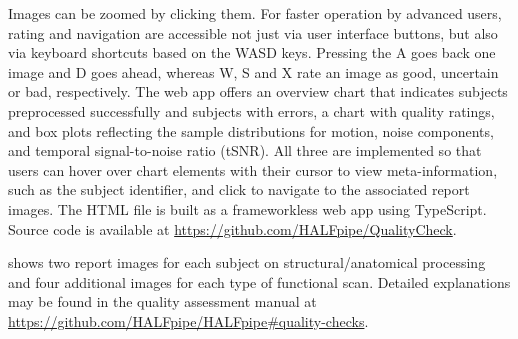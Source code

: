 Images can be zoomed by clicking them. For faster operation by advanced
users, rating and navigation are accessible not just via user interface
buttons, but also via keyboard shortcuts based on the WASD keys. Pressing
the A goes back one image and D goes ahead, whereas W, S and X rate an
image as good, uncertain or bad, respectively. The web app offers an
overview chart that indicates subjects preprocessed successfully and
subjects with errors, a chart with quality ratings, and box plots
reflecting the sample distributions for motion, noise components, and
temporal signal-to-noise ratio (tSNR). All three are implemented so that
users can hover over chart elements with their cursor to view
meta-information, such as the subject identifier, and click to navigate to
the associated report images. The HTML file is built as a frameworkless web
app using TypeScript. Source code is available at
\url{https://github.com/HALFpipe/QualityCheck}.

 shows two report images for each subject on
structural/anatomical processing and four additional images for each type
of functional scan. Detailed explanations may be found in the quality
assessment manual at
\url{https://github.com/HALFpipe/HALFpipe\#quality-checks}.

